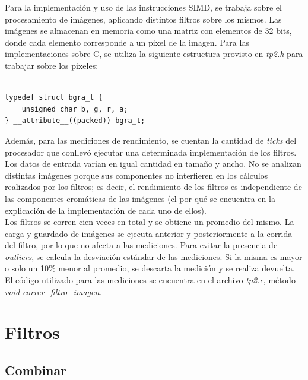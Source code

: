 \documentclass[a4paper]{article}
\newenvironment{codesnippet}{%
	\begin{Sbox}\begin{minipage}{\textwidth}\sffamily\small}%
	{\end{minipage}\end{Sbox}%
		\begin{center}%
		\vspace{-0.4cm}\colorbox{litegrey}{\TheSbox}\end{center}\vspace{0.3cm}}
\begin{document}
Para la implementación y uso de las instrucciones SIMD, se trabaja sobre el procesamiento de imágenes, aplicando distintos filtros sobre los mismos. Las imágenes se almacenan en memoria como una matriz con elementos de 32 bits, donde cada elemento corresponde a un pixel de la imagen. Para las implementaciones sobre C, se utiliza la siguiente estructura provisto en \textit{tp2.h} para trabajar sobre los píxeles:
\begin{codesnippet}
\begin{verbatim}

typedef struct bgra_t {
	unsigned char b, g, r, a;
} __attribute__((packed)) bgra_t;

\end{verbatim}
\end{codesnippet}

Además, para las mediciones de rendimiento, se cuentan la cantidad de \textit{ticks} del procesador que conllevó ejecutar una determinada implementación de los filtros. Los datos de entrada varían en igual cantidad en tamaño y ancho. No se analizan distintas imágenes porque sus componentes no interfieren en los cálculos realizados por los filtros; es decir, el rendimiento de los filtros es independiente de las componentes cromáticas de las imágenes (el por qué se encuentra en la explicación de la implementación de cada uno de ellos).
\\Los filtros se corren cien veces en total y se obtiene un promedio del mismo. La carga y guardado de imágenes se ejecuta anterior y posteriormente a la corrida del filtro, por lo que no afecta a las mediciones. Para evitar la presencia de \textit{outliers}, se calcula la desviación estándar de las mediciones. Si la misma es mayor o solo un 10\% menor al promedio, se descarta la medición y se realiza devuelta.
\\El código utilizado para las mediciones se encuentra en el archivo \textit{tp2.c}, método \textit{void correr_filtro_imagen}.
\newpage
\section{Filtros} 
\subsection{Combinar}
\end{document}
